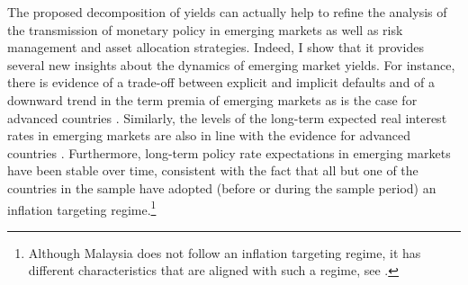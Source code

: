 {The proposed decomposition of yields can actually help to refine the analysis of the transmission of monetary policy in emerging markets as well as risk management and asset allocation strategies. %
Indeed, I show that it provides several new insights about the dynamics of emerging market yields.
For instance, there is evidence of a trade-off between explicit and implicit defaults and of a downward trend in the term premia of emerging markets as is the case for advanced countries \citep{Wright:2011}. 
Similarly, the levels of the long-term expected real interest rates in emerging markets are also in line with the evidence for advanced countries \citep*{HolstonLaubachWilliams:2017}. 
Furthermore, long-term policy rate expectations in emerging markets have been stable over time, consistent with the fact that all but one of the countries in the sample have adopted (before or during the sample period) an inflation targeting regime.\footnote{ Although Malaysia does not follow an inflation targeting regime, it has different characteristics that are aligned with such a regime, see \cite{PenningsRamayandiTang:2015}.}


}
